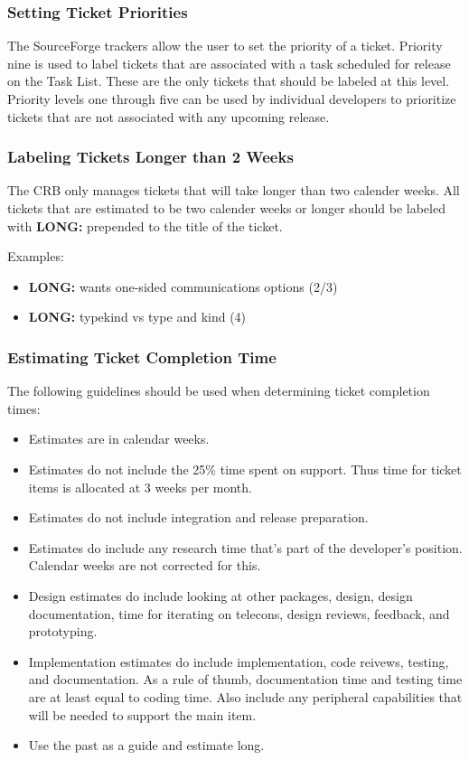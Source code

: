 \subsubsection{Setting Ticket Priorities}

The SourceForge trackers allow the user to set the priority of a ticket. Priority nine is used
to label tickets that are associated with a task scheduled for release on the Task List.
These are the only tickets
that should be labeled at this level. Priority levels one through five can be used by individual
developers to prioritize tickets that are not associated with any upcoming release.

\subsubsection{Labeling Tickets Longer than 2 Weeks}
\label{sec:longticket}
The CRB only manages tickets that will take longer than two calender weeks.
All tickets that are estimated to be two calender weeks or longer should
be labeled with {\bf LONG:} prepended to the title of the ticket. 

\vspace{2mm}
Examples:
\begin{itemize}
\item  {\bf LONG:} wants one-sided communications options (2/3) 
\item  {\bf LONG:} typekind vs type and kind (4)
\end{itemize}

\subsubsection{Estimating Ticket Completion Time}

The following guidelines should be used when determining ticket completion times:

\begin{itemize}
\item Estimates are in calendar weeks.
\item Estimates do not include the 25\% time spent on support.  Thus
time for ticket items is allocated at 3 weeks per month.
\item Estimates do not include integration and release preparation.
\item Estimates do include any research time that's part of the developer's position. Calendar weeks are not corrected for this.
\item Design estimates do include looking at other packages, design, design documentation, time for iterating on telecons, design reviews, feedback, and prototyping.
\item Implementation estimates do include implementation, code reivews, testing, and documentation. As a rule of thumb, documentation time and testing time are at least equal to coding time. Also include any peripheral capabilities that will be needed to support the main item.
\item Use the past as a guide and estimate long.
\end {itemize}

